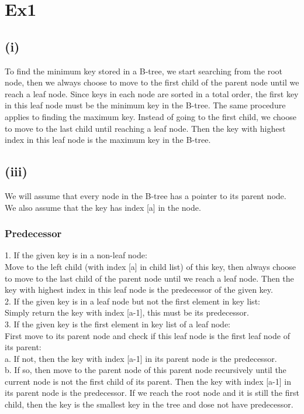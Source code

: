 \documentclass{article}
\begin{document}
\section*{Ex1}
\subsection*{(i)}
    To find the minimum key stored in a B-tree, we start searching from the root node, 
then we always choose to move to the first child of the parent node until we reach a leaf node. 
Since keys in each node are sorted in a total order, the first key in this leaf node must be 
the minimum key in the B-tree.
    The same procedure applies to finding the maximum key. Instead of going to the first child, we 
choose to move to the last child until reaching a leaf node. Then the key with highest index in this 
leaf node is the maximum key in the B-tree.

\subsection*{(iii)}
    We will assume that every node in the B-tree has a pointer to its parent node. We also assume 
that the key has index [a] in the node.
\subsubsection*{Predecessor}
    1. If the given key is in a non-leaf node:\\
    Move to the left child (with index [a] in child list) of this key, then always choose to move 
to the last child of the parent node until we reach a leaf node. Then the key with highest index in 
this leaf node is the predecessor of the given key.\\
    2. If the given key is in a leaf node but not the first element in key list:\\
    Simply return the key with index [a-1], this must be its predecessor.\\
    3. If the given key is the first element in key list of a leaf node:\\
    First move to its parent node and check if this leaf node is the first leaf node of its parent:\\
        a. If not, then the key with index [a-1] in its parent node is the predecessor.\\
        b. If so, then move to the parent node of this parent node recursively until the current node 
    is not the first child of its parent. Then the key with index [a-1] in its parent node is the predecessor. 
    If we reach the root node and it is still the first child, then the key is the smallest key in the 
    tree and dose not have predecessor.
\end{document}
